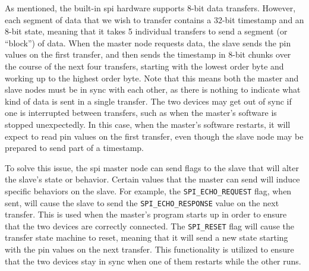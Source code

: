 \documentclass[12pt]{article}
\begin{document}
As mentioned, the built-in \gls{spi} hardware supports 8-bit data transfers.
However, each segment of data that we wish to transfer contains a 32-bit
timestamp and an 8-bit state, meaning that it takes 5 individual transfers
to send a segment (or ``block'') of data.
When the master node requests data, the slave sends the pin values on the
first transfer, and then sends the timestamp in 8-bit chunks over the course of
the next four transfers, starting with the lowest order byte and working up to
the highest order byte.
Note that this means both the master and slave nodes must be in sync with
each other, as there is nothing to indicate what kind of data is sent in a
single transfer.
The two devices may get out of sync if one is interrupted between transfers,
such as when the master's software is stopped unexpectedly.
In this case, when the master's software restarts, it will expect to read
pin values on the first transfer, even though the slave node may be prepared
to send part of a timestamp.

To solve this issue, the \gls{spi} master node can send flags to the slave
that will alter the slave's state or behavior.
Certain values that the master can send will induce specific behaviors on the
slave.
For example, the \texttt{SPI\_ECHO\_REQUEST} flag, when sent, will cause the
slave to send the \texttt{SPI\_ECHO\_RESPONSE} value on the next transfer.
This is used when the master's program starts up in order to ensure that the
two devices are correctly connected.
The \texttt{SPI\_RESET} flag will cause the transfer state machine to reset,
meaning that it will send a new state starting with the pin values on the next
transfer.
This functionality is utilized to ensure that the two devices stay in sync when
one of them restarts while the other runs.

%
%
%
\end{document}
